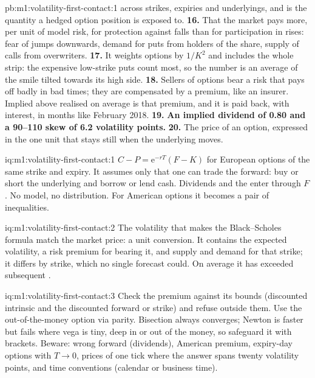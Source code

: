 \begin{solution}{pb:m1:volatility-first-contact:1}
across strikes, expiries and underlyings, and is the quantity a hedged
option position is exposed to.
\textbf{16.} That the market pays more, per unit of model risk, for
protection against falls than for participation in rises: fear of jumps
downwards, demand for puts from holders of the share, supply of calls from
overwriters.
\textbf{17.} It weights options by $1/K^2$ and includes the whole strip: the
expensive low-strike puts count most, so the number is an average of the
smile tilted towards its high side.
\textbf{18.} Sellers of options bear a risk that pays off badly in bad times;
they are compensated by a premium, like an insurer. Implied above realised on
average is that premium, and it is paid back, with interest, in months like
February 2018.
\textbf{19.} \textbf{An implied dividend of 0.80 and a 90--110 skew of 6.2
volatility points.}
\textbf{20.} The price of an option, expressed in the one unit that stays
still when the underlying moves.
\end{solution}

\begin{solution}{iq:m1:volatility-first-contact:1}
$C - P = \mathrm{e}^{-rT}(F - K)$ for European options of the same strike and
expiry. It assumes only that one can trade the forward: buy or short the
underlying and borrow or lend cash. Dividends and the  enter
through $F$. No model, no distribution. For American options it becomes a
pair of inequalities.
\end{solution}

\begin{solution}{iq:m1:volatility-first-contact:2}
The volatility that makes the Black--Scholes formula match the market price:
a unit conversion. It contains the expected volatility, a risk premium for
bearing it, and supply and demand for that strike; it differs by strike,
which no single forecast could. On average it has exceeded subsequent
.
\end{solution}

\begin{solution}{iq:m1:volatility-first-contact:3}
Check the premium against its bounds (discounted intrinsic and the
discounted forward or strike) and refuse outside them. Use the
out-of-the-money option via parity. Bisection always converges; Newton is
faster but fails where vega is tiny, deep in or out of the money, so
safeguard it with brackets. Beware: wrong forward (dividends), American
premium, expiry-day options with $T \to 0$, prices of one tick where the
answer spans twenty volatility points, and time conventions (calendar or
business time).
\end{solution}

